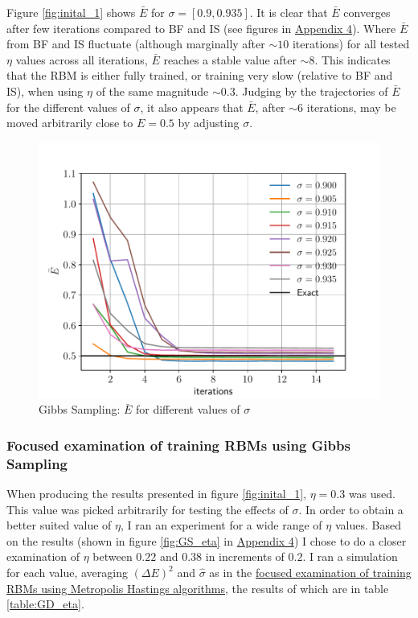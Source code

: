 \documentclass[%
oneside,                 %
final,                   %
10pt]{article}
\begin{document}
Figure \ref{fig:inital_1} shows $\bar E$ for $\sigma=[0.9,0.935]$. It is clear that $\bar E$ converges after few iterations compared to BF and IS (see figures in \hyperref[APP_4]{Appendix 4}). Where $\bar E$ from BF and IS fluctuate (although marginally after $\sim 10$ iterations) for all tested $\eta$ values across all iterations, $\bar E$ reaches a stable value after $\sim 8$. This indicates that the RBM is either fully trained, or training very slow (relative to BF and IS), when using $\eta$ of the same magnitude $\sim 0.3$. Judging by the trajectories of $\bar E$ for the different values of $\sigma$, it also appears that $\bar E$, after $\sim 6$  iterations, may be moved arbitrarily close to $E=0.5$ by adjusting $\sigma$. 
\begin{figure}[!h]
        \centering 
         \includegraphics[scale=0.8]{../Results/sim_8/GS_sigma.pdf} 
        \caption{Gibbs Sampling:  $\bar E$ for different values of $\sigma$ }
        \label{fig:GS_sigma}   
\end{figure}  


\subsubsection{Focused examination of training RBMs using Gibbs Sampling} \label{Results_focused_GS}
When producing the results presented in figure \ref{fig:inital_1}, $\eta = 0.3$ was used. This value was picked arbitrarily for testing the effects of $\sigma$. In order to obtain a better suited value of $\eta$, I ran an experiment for a wide range of $\eta$ values. Based on the results (shown in figure \ref{fig:GS_eta} in \hyperref[APP_4]{Appendix 4}) I chose to do a closer examination of $\eta$ between $0.22$ and $0.38$ in increments of $0.2$. I ran a simulation for each value, averaging $(\Delta E)^2$ and $\hat \sigma$ as in the \hyperref[Results_focused_MH]{focused examination of training RBMs using Metropolis Hastings algorithms}, the results of which are in table \ref{table:GD_eta}. 
\end{document}
